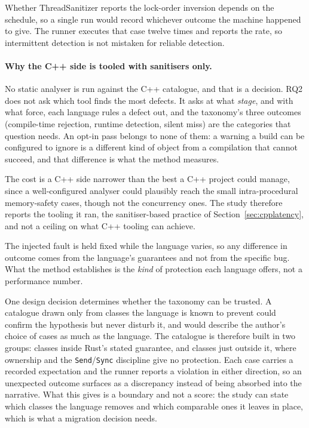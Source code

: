 \documentclass[english,oneside,a4paper,censored,csm,software-track-2020]{HYthesisML}
\begin{document}
Whether ThreadSanitizer reports the lock-order inversion depends on the schedule, so a single run
would record whichever outcome the machine happened to give. The runner executes that case twelve
times and reports the rate, so intermittent detection is not mistaken for reliable detection.

\paragraph{Why the C++ side is tooled with sanitisers only.}
No static analyser is run against the C++ catalogue, and that is a decision. RQ2 does not ask
which tool finds the most defects. It asks at what \emph{stage}, and with what force, each
language rules a defect out, and the taxonomy's three outcomes (compile-time rejection, runtime
detection, silent miss) are the categories that question needs. An opt-in pass belongs to none
of them: a warning a build can be configured to ignore is a different kind of object from a
compilation that cannot succeed, and that difference is what the method measures.

The cost is a C++ side narrower than the best a C++ project could manage, since a well-configured
analyser could plausibly reach the small intra-procedural memory-safety cases, though not the
concurrency ones. The study therefore reports the tooling it ran, the sanitiser-based practice of
Section~\ref{sec:cpplatency}, and not a ceiling on what C++ tooling can achieve.

The injected fault is held fixed while the language varies, so any difference in outcome comes
from the language's guarantees and not from the specific bug. What the method establishes is the
\emph{kind} of protection each language offers, not a performance number.

One design decision determines whether the taxonomy can be trusted. A catalogue drawn only from
classes the language is known to prevent could confirm the hypothesis but never disturb it, and
would describe the author's choice of cases as much as the language. The catalogue is
therefore built in two groups: classes inside Rust's stated guarantee, and classes just outside
it, where ownership and the \texttt{Send}/\texttt{Sync} discipline give no protection. Each case
carries a recorded expectation and the runner reports a violation in either direction, so an
unexpected outcome surfaces as a discrepancy instead of being absorbed into the narrative. What
this gives is a boundary and not a score: the study can state which classes the language removes
and which comparable ones it leaves in place, which is what a migration decision needs.
\end{document}

